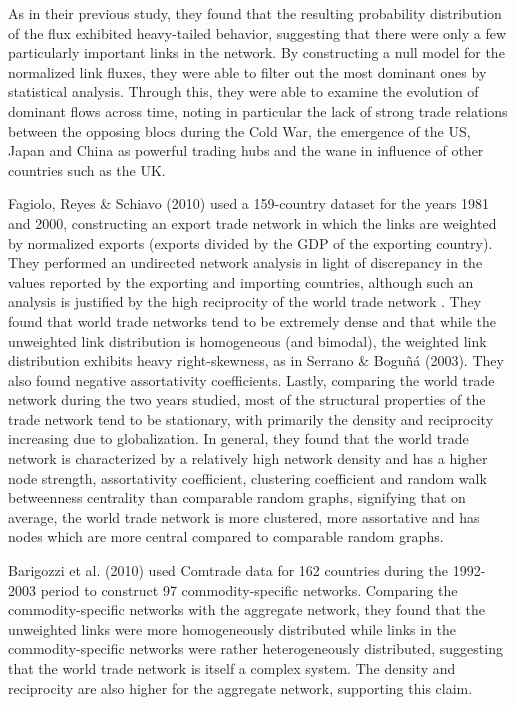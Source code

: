 \documentclass[12pt,letterpaper]{report}
\begin{document}
	As in their previous study, they found that the resulting probability distribution of the flux exhibited heavy-tailed behavior, suggesting that there were only a few particularly important links in the network. By constructing a null model for the normalized link fluxes, they were able to filter out the most dominant ones by statistical analysis. Through this, they were able to examine the evolution of dominant flows across time, noting in particular the lack of strong trade relations between the opposing blocs during the Cold War, the emergence of the US, Japan and China as powerful trading hubs and the wane in influence of other countries such as the UK.
	
	Fagiolo, Reyes \& Schiavo (2010) used a 159-country dataset for the years 1981 and 2000, constructing an export trade network in which the links are weighted by normalized exports (exports divided by the GDP of the exporting country). They performed an undirected network analysis in light of discrepancy in the values reported by the exporting and importing countries, although such an analysis is justified by the high reciprocity of the world trade network \cite{serrano2003topology}. They found that world trade networks tend to be extremely dense and that while the unweighted link distribution is homogeneous (and bimodal), the weighted link distribution exhibits heavy right-skewness, as in Serrano \& Boguñá (2003). They also found negative assortativity coefficients. Lastly, comparing the world trade network during the two years studied, most of the structural properties of the trade network tend to be stationary, with primarily the density and reciprocity increasing due to globalization. In general, they found that the world trade network is characterized by a relatively high network density and has a higher node strength, assortativity coefficient, clustering coefficient and random walk betweenness centrality than comparable random graphs, signifying that on average, the world trade network is more clustered, more assortative and has nodes which are more central compared to comparable random graphs.
	
	Barigozzi et al. (2010) used Comtrade data for 162 countries during the 1992-2003 period to construct 97 commodity-specific networks. Comparing the commodity-specific networks with the aggregate network, they found that the unweighted links were more homogeneously distributed while links in the commodity-specific networks were rather heterogeneously distributed, suggesting that the world trade network is itself a complex system. The density and reciprocity are also higher for the aggregate network, supporting this claim.
	
\end{document}
